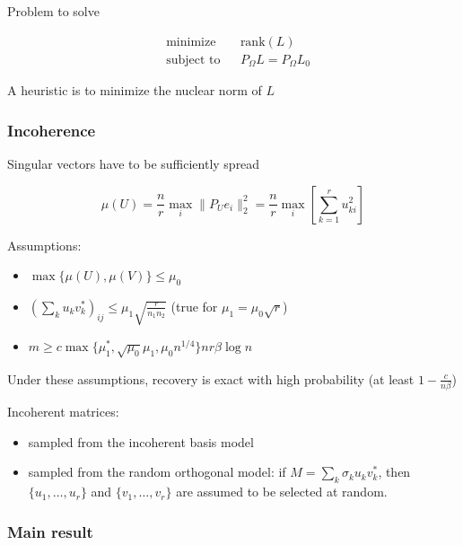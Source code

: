 \documentclass{../common/projectreport}
\begin{document}
Problem to solve

\begin{equation}
\begin{aligned}
&\text{minimize} && \text{rank}(L) \\
&\text{subject to} && P_\Omega L = P_\Omega L_0
\end{aligned}
\end{equation}


A heuristic is to minimize the nuclear norm of $L$

\subsubsection{Incoherence}

Singular vectors have to be sufficiently spread

\begin{equation}
\mu(U) = \frac{n}{r} \max_i \|P_U e_i\|_2^2 = \frac{n}{r} \max_i \left[ \sum_{k=1}^r u_{ki}^2 \right]
\label{emc_incoherence}
\end{equation}

Assumptions:
\begin{itemize}
\item $\max \{\mu(U), \mu(V)\} \leq \mu_0$
\item $\left( \sum_k u_kv_k^*\right)_{ij} \leq \mu_1 \sqrt{\frac{r}{n_1 n_2}}$ (true for $\mu_1 = \mu_0\sqrt{r}$)
\item $m \geq c \max \{ \mu_1^*, \sqrt{\mu_0}\mu_1, \mu_0 n^{1/4}\}n r \beta \log n$
\end{itemize}

Under these assumptions, recovery is exact with high probability (at least $1-\frac{c}{n\beta}$)

Incoherent matrices:
\begin{itemize}
\item sampled from the incoherent basis model
\item sampled from the random orthogonal model: if $M = \sum_k \sigma_k u_k v_k^*$, then $\{u_1, \dots, u_r\}$ and $\{v_1, \dots, v_r\}$ are assumed to be selected at random.

\end{itemize}

\subsubsection{Main result}
\end{document}
